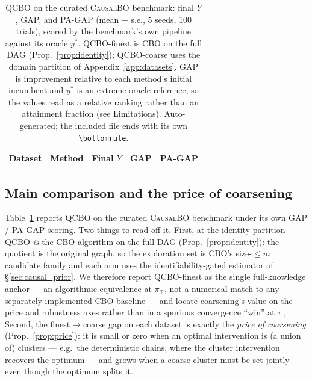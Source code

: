 \documentclass{article}
\newcommand{\QCBO}{\textsc{QCBO}}
\newcommand{\CBO}{\textsc{CBO}}
\begin{document}
\begin{table}[t]
  \centering
  \caption{\QCBO{} on the curated \textsc{CausalBO} benchmark: final $Y$,
  GAP, and PA-GAP (mean $\pm$ s.e., 5 seeds, 100 trials), scored by the
  benchmark's own pipeline against its oracle $y^*$. \QCBO{}-finest is
  \CBO{} on the full DAG (Prop.~\ref{prop:identity}); \QCBO{}-coarse uses the
  domain partition of Appendix~\ref{app:datasets}. GAP is improvement relative
  to each method's initial incumbent and $y^*$ is an extreme oracle reference,
  so the values read as a relative ranking rather than an attainment fraction
  (see Limitations). Auto-generated; the
  included file ends with its own \texttt{\textbackslash bottomrule}.}
  \label{tab:benchmark}
  \vspace{4pt}
  \small
  \begin{tabular}{@{}llccc@{}}
    \toprule
    \textbf{Dataset} & \textbf{Method} & \textbf{Final $Y$} &
    \textbf{GAP} & \textbf{PA-GAP} \\
    \midrule
    
  \end{tabular}
\end{table}

\subsection{Main comparison and the price of coarsening}
\label{sec:main_results}

Table~\ref{tab:benchmark} reports \QCBO{} on the curated \textsc{CausalBO}
benchmark under its own GAP / PA-GAP scoring. Two things to read off it.
First, at the identity partition \QCBO{} \emph{is} the \CBO{} algorithm on the
full DAG (Prop.~\ref{prop:identity}): the quotient is the original graph, so the
exploration set is \CBO{}'s size-$\le m$ candidate family and each arm uses the
identifiability-gated estimator of \S\ref{sec:causal_prior}. We therefore report
\QCBO{}-finest as the single full-knowledge anchor --- an algorithmic
equivalence at $\pi_\top$, not a numerical match to any separately implemented
\CBO{} baseline --- and locate coarsening's value on the price and robustness
axes rather than in a spurious convergence ``win'' at $\pi_\top$. Second, the finest$\to$coarse gap on each
dataset is exactly the \emph{price of coarsening} (Prop.~\ref{prop:price}): it
is small or zero when an optimal intervention is (a union of) clusters --- e.g.\
the deterministic chains, where the cluster intervention recovers the optimum
--- and grows when a coarse cluster must be set jointly even though the optimum
splits it.
\end{document}
